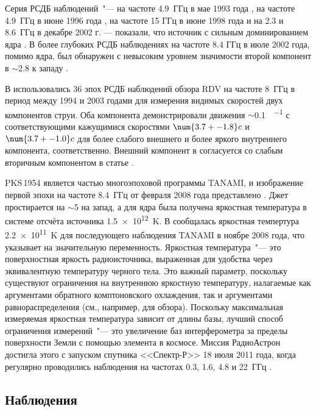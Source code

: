 Серия РСДБ наблюдений~"--- на частоте 4.9~ГГц в мае 1993 года \cite{Shen_1998}, на частоте
4.9~ГГц в июне 1996 года \cite{Fomalont_2000}, на частоте 15 ГГц в июне 1998 года
\cite{Kovalev_2005} и на 2.3 и 8.6~ГГц в декабре 2002 г. \cite{Pushkarev_Kovalev_2012} --- показали,
что источник с сильным доминированием ядра \cite{Pushkarev_Kovalev_2015}. В более глубоких РСДБ
наблюдениях на частоте 8.4 ГГц в июле 2002 года, помимо ядра, был обнаружен с невысоким уровнем
значимости второй компонент в $\sim$\SI{2.8}{\mas} к западу \cite{Ojha_2004}.

В \cite{Piner_2012} использовались 36 эпох РСДБ наблюдений обзора RDV на частоте 8~ГГц
в период между 1994 и 2003 годами для измерения видимых скоростей двух компонентов струи. Оба
компонента демонстрировали движения $\sim$\SI{0.1}{\mas\per\year} с соответствующими кажущимися
скоростями $\num{3.7+-1.8} c$ и $\num{3.7+-1.0} c$ для более слабого внешнего и более яркого
внутреннего компонента, соответственно. Внешний компонент в \cite{Piner_2012} согласуется со
слабым вторичным компонентом в статье \cite{Ojha_2004}.

PKS\,1954 является частью многоэпоховой программы TANAMI, и изображение первой эпохи на
частоте 8.4~ГГц от февраля 2008 года представлено \cite{Ojha_2010}. Джет простирается на
$\sim$\SI{5}{\mas} на запад, а для ядра была получена яркостная температура в системе отсчёта
источника \SI{1.5e12}{\kelvin}. В \cite{Bock_2016} сообщалась яркостная темпертура
\SI{2.2e11}{\kelvin} для последующего наблюдения TANAMI в ноябре 2008 года, что указывает на
значительную переменность. Яркостная температура~"--- это поверхностная яркость радиоисточника,
выраженная для удобства через эквивалентную температуру черного тела. Это важный параметр, поскольку
существуют ограничения на внутреннюю яркостную температуру, налагаемые как аргументами обратного
комптоновского охлаждения, так и аргументами равнораспределения (см., например,
\cite{Kellermann_2002} для обзора). Поскольку максимальная измеряемая яркостная температура зависит
от длины базы, лучший способ ограничения измерений~"--- это увеличение баз интерферометра за пределы
поверхности Земли с помощью элемента в космосе. Миссия РадиоАстрон достигла этого с запуском
спутника <<Спектр-Р>> 18 июля 2011 года, когда регулярно проводились наблюдения на частотах 0.3,
1.6, 4.8 и 22~ГГц \cite{Kardashev_2013_rus}.

\subsection{Наблюдения}

